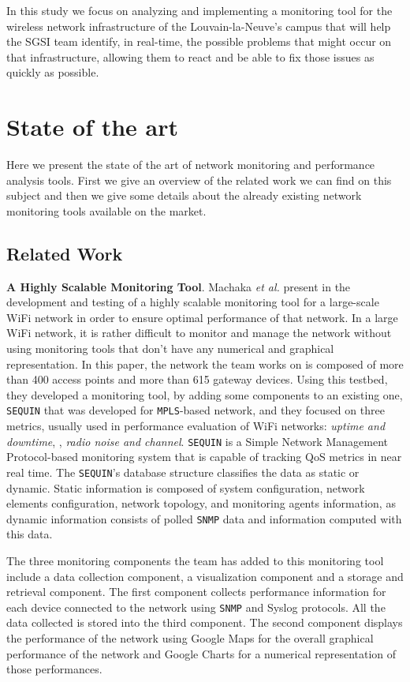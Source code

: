 In this study we focus on analyzing and implementing a monitoring tool for the wireless network infrastructure of the Louvain-la-Neuve's campus that will help the SGSI team identify, in real-time, the possible problems that might occur on that infrastructure, allowing them to react and be able to fix those issues as quickly as possible.


\section{State of the art}
Here we present the state of the art of network monitoring and performance analysis tools.
First we give an overview of the related work we can find on this subject and then we give some details about the already existing network monitoring tools available on the market.

\subsection{Related Work}

\textbf{A Highly Scalable Monitoring Tool}. Machaka \textit{et al.} present in \cite{article1} the development and testing of a highly scalable monitoring tool for a large-scale WiFi network in order to ensure optimal performance of that network. In a large WiFi network, it is rather difficult to monitor and manage the network without using monitoring tools that don't have any numerical and graphical representation. In this paper, the network the team works on is composed of more than 400 access points and more than 615 gateway devices. Using this testbed, they developed a monitoring tool, by adding some components to an existing one, \texttt{SEQUIN} \cite{sequin} that was developed for \texttt{MPLS}-based network, and they focused on three metrics, usually used in performance evaluation of WiFi networks: \textit{uptime and downtime}, , \textit{radio noise and channel}. \texttt{SEQUIN} is a Simple Network Management Protocol-based monitoring system that is capable of tracking QoS metrics in near real time. The \texttt{SEQUIN}'s database structure classifies the data as static or dynamic. Static information is composed of system configuration, network elements configuration, network topology, and monitoring agents information, as dynamic information consists of polled \texttt{SNMP} data and information computed with this data. 

The three monitoring components the team has added to this monitoring tool include a data collection component, a visualization component and a storage and retrieval component. The first component collects performance information for each device connected to the network using \texttt{SNMP} and {Syslog} protocols. All the data collected is stored into the third component. The second component displays the performance of the network using Google Maps for the overall graphical performance of the network and Google Charts for a numerical representation of those performances.


